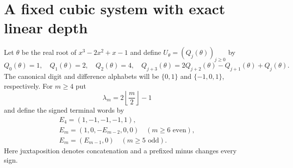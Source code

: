 \section{A fixed cubic system with exact linear depth}
\label{sec:fixed-cubic-sharpness}

Let $\theta$ be the real root of $x^3-2x^2+x-1$ and define
$U_\theta=(Q_j(\theta))_{j\ge0}$ by
\begin{equation}
Q_0(\theta)=1,\quad Q_1(\theta)=2,\quad Q_2(\theta)=4,
\quad Q_{j+3}(\theta)=2Q_{j+2}(\theta)-Q_{j+1}(\theta)+Q_j(\theta).
\label{eq:theta-count-recurrence}
\end{equation}
The canonical digit and difference alphabets will be $\{0,1\}$ and
$\{-1,0,1\}$, respectively.  For $m\ge4$ put
\[
\lambda_m=2\left\lfloor\frac m2\right\rfloor-1
\]
and define the signed terminal words by
\begin{equation}
\begin{gathered}
E_4=(1,-1,-1,-1,1),\\
E_m=(1,0,-E_{m-2},0,0)\quad(m\ge6\text{ even}),\\
E_m=(E_{m-1},0)\quad(m\ge5\text{ odd}).
\end{gathered}
\label{eq:theta-terminal-word}
\end{equation}
Here juxtaposition denotes concatenation and a prefixed minus changes every
sign.

